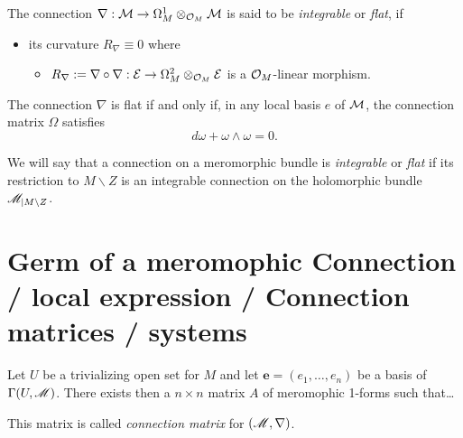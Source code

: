 \begin{defn}[Flatness (0.12.2)]
  The connection $\nabla:\mathcal{M}\to \Omega_M^1\otimes_{\mathcal{O}_M}\mathcal{M}$ is said to be
  \emph{integrable} or \emph{flat}, if
  \begin{itemize}
    \item its curvature $R_\nabla\equiv0$
    where
    \begin{itemize}
      \item $R_\nabla:=\nabla\circ\nabla:\mathcal{E}\to\Omega_M^2\otimes_{\mathcal{O}_M}\mathcal{E}$
        is a $\mathcal{O}_M$-linear morphism.
    \end{itemize}
  \end{itemize}
  \begin{prop}[0.12.4]
    The connection $\nabla$ is flat if and only if, in any local basis $e$ of
    $\mathcal{M}$, the connection matrix $\Omega$ satisfies
    \[
      d\omega + \omega \wedge \omega = 0.
    \]
  \end{prop}
  We will say that a connection on a meromorphic bundle is \emph{integrable} or
  \emph{flat} if its restriction to $M\backslash Z$ is an integrable connection
  on the holomorphic bundle $\mathscr{M}_{|M\backslash Z}$.
\end{defn}

\section{Germ of a meromophic Connection / local expression / Connection
  matrices / systems}
\begin{comment}
  \cite{sabbah2007isomonodromic} p.28
\end{comment}
\begin{comment}
  \cite{boalch} wants \textbf{generic} meromorphic connections
  \begin{itemize}
    \item\dots simplest jet sufficient\dots
  \end{itemize}
\end{comment}

Let $U$ be a trivializing open set for $M$ and let $\textbf{e}=(e_1,\dots,e_n)$
be a basis of $\Gamma(U,\mathscr{M})$.
There exists then a $n\times n$ matrix $A$ of meromophic 1-forms such
that\dots
\begin{defn}
  This matrix is called \emph{connection matrix} for $(\mathscr{M},\nabla)$.
\end{defn}

\begin{comment}
  \TODO[Gauge transformation]
  \begin{itemize}
    \item meromorphic transformation \cite{Loday1994} p. 852
    \item holomorphic trasformation
  \end{itemize}
\end{comment}

